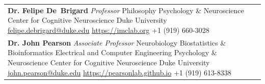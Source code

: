 \documentclass[margin]{res}
\begin{document}
\begin{resume}
\begin{tabular}{p{6cm} p{5.5cm}}
    \textbf{Dr. Felipe De~Brigard}\newline
    \small{
      \emph{Professor}\newline
      Philosophy\newline
      Psychology \& Neuroscience\newline
      Center for Cognitive Neuroscience\newline
      Duke University\newline
      \href{mailto:felipe.debrigard@duke.edu}{felipe.debrigard@duke.edu} \newline
      \url{https://imclab.org}\newline
      +1 (919) 660-3028
    }
    \\

    \vspace{\baselineskip}
    \textbf{Dr. John Pearson}\newline
    \small{
      \emph{Associate Professor}\newline
      Neurobiology\newline
      Biostatistics \& Bioinformatics\newline
      Electrical and Computer Engineering\newline
      Psychology \& Neuroscience\newline
      Center for Cognitive Neuroscience\newline
      Duke University\newline
      \href{mailto:john.pearson@duke.edu}{john.pearson@duke.edu}\newline
      \url{https://pearsonlab.github.io}\newline
      +1 (919) 613-8338
    }
  \end{tabular}
\end{resume}
\end{document}
